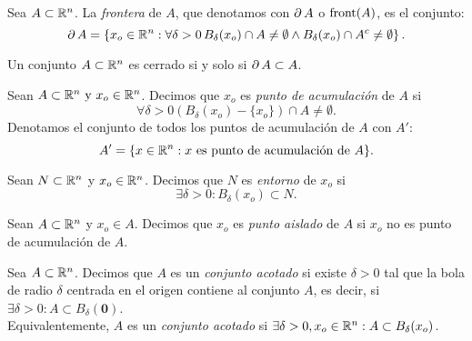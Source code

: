    \begin{definition}  \label{def:frontera}
    Sea $A \subset \mathbb{R}^n$. La \emph{frontera} de $A$, que denotamos con $\operatorname{\partial} A$ o $\operatorname{front}(A)$, es el conjunto:
    \[
     \operatorname{\partial} A = \left\lbrace x_o \in \mathbb{R}^n : \forall \delta > 0 \,
     B_{\delta}(x_o) \cap A \ne \emptyset \wedge
     B_{\delta}(x_o) \cap A^c \ne \emptyset \right\rbrace.
    \]
   \end{definition}
   
   \begin{propertie} \label{prop:cerrado_front}
    Un conjunto $A \subset \mathbb{R}^n$ es cerrado si y solo si $\operatorname{\partial} A \subset A$.
   \end{propertie}
   
   \begin{definition}  \label{def:pto_acum}
    Sean $A \subset \mathbb{R}^n \text{ y } x_o \in \mathbb{R}^n$. Decimos que $x_o$ es \emph{punto de acumulaci\'on} de $A$ si
    \[
     \forall \delta > 0 \left( B_{\delta}(x_o) - \{ x_o \} \right) \cap A \ne \emptyset. 
    \]
    Denotamos el conjunto de todos los puntos de acumulaci\'on de $A$ con $A'$:
    \[
     A' = \{ x \in \mathbb{R}^n : x \text{ es punto de acumulaci\'on de } A \}.
    \]
   
   \end{definition}
   
   \begin{definition}  \label{def:entorno}
    Sean $N \subset  \mathbb{R}^n$ y $x_o \in \mathbb{R}^n$. Decimos que $N$ es \emph{entorno} de $x_o$ si
    \[
     \exists \delta > 0 : B_{\delta}(x_o) \subset N.
    \]
   \end{definition}
   
   \begin{definition}  \label{def:pto_ais}
    Sean $A \subset  \mathbb{R}^n$ y $x_o \in A$. Decimos que $x_o$ es \emph{punto aislado} de $A$ si $x_o$ no es punto de acumulaci\'on de $A$.
   \end{definition}
   
   \begin{definition}  \label{def:conj_acotado}
    Sea $A \subset \mathbb{R}^n$. Decimos que $A$ es un \emph{conjunto acotado} si existe $\delta > 0$ tal que la bola de radio $\delta$  centrada en el origen contiene al conjunto $A$, es decir, si $\exists \delta > 0 : A \subset B_{\delta}(\mathbf{0})$.\\
    Equivalentemente, $A$ es un \emph{conjunto acotado} si $\exists \delta > 0, x_o \in \mathbb{R}^n : A \subset B_{\delta}(x_o)$.
   \end{definition}
   
